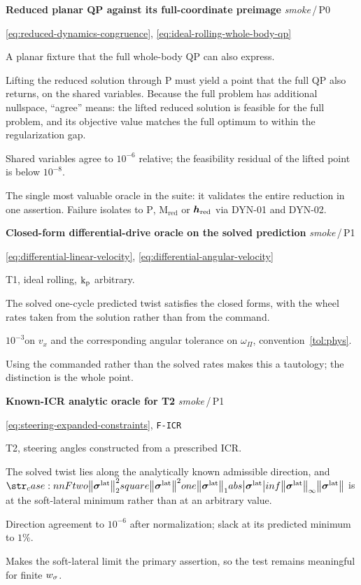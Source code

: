 \documentclass[10pt]{article}
\newcommand{\slackVariable}{\bs{\sigma}}
\newenvironment{testcard}[4]{%
  \par\medskip\noindent
  \tBlock{#1}\quad\textbf{#2}%
  \hfill{\small\textit{#3}\,/\,#4}\par\nopagebreak\vspace{2pt}
  \begin{description}[leftmargin=7.5em,style=sameline,itemsep=1pt,topsep=1pt]
}{%
  \end{description}\par\medskip
}
\begin{document}
\begin{testcard}{ORC-02}{Reduced planar QP against its full-coordinate preimage}{smoke}{P0}
  \item[Targets] \eqref{eq:reduced-dynamics-congruence},
    \eqref{eq:ideal-rolling-whole-body-qp}
  \item[Regime] A planar fixture that the full whole-body QP can also express.
  \item[Invariant] Lifting the reduced solution through $\text{P}$ must yield a
    point that the full QP also returns, on the shared variables. Because the
    full problem has additional nullspace, ``agree'' means: the lifted reduced
    solution is feasible for the full problem, and its objective value matches
    the full optimum to within the regularization gap.
  \item[Pass] Shared variables agree to $10^{-6}$ relative; the feasibility
    residual of the lifted point is below $10^{-8}$.
  \item[Diagnosis] The single most valuable oracle in the suite: it validates
    the entire reduction in one assertion. Failure isolates to $\text{P}$,
    $\text{M}_{\text{red}}$ or $\boldsymbol{h}_{\text{red}}$ via DYN-01 and DYN-02.
\end{testcard}

\begin{testcard}{ORC-03}{Closed-form differential-drive oracle on the solved prediction}{smoke}{P1}
  \item[Targets] \eqref{eq:differential-linear-velocity},
    \eqref{eq:differential-angular-velocity}
  \item[Regime] T1, ideal rolling, $\text{k}_{\text{p}}$ arbitrary.
  \item[Invariant] The solved one-cycle predicted twist satisfies the closed
    forms, with the wheel rates taken from the solution rather than from the
    command.
  \item[Pass] $10^{-3}$\unitVelTS on $v_x$ and the corresponding angular
    tolerance on $\omega_{\Pi}$, convention~\ref{tol:phys}.
  \item[Diagnosis] Using the commanded rather than the solved rates makes this
    a tautology; the distinction is the whole point.
\end{testcard}

\begin{testcard}{ORC-04}{Known-ICR analytic oracle for T2}{smoke}{P1}
  \item[Targets] \eqref{eq:steering-expanded-constraints}, \texttt{F-ICR}
  \item[Regime] T2, steering angles constructed from a prescribed ICR.
  \item[Invariant] The solved twist lies along the analytically known
    admissible direction, and $\norm{\slackVariable^{\text{lat}}}$ is at the
    soft-lateral minimum rather than at an arbitrary value.
  \item[Pass] Direction agreement to $10^{-6}$ after normalization; slack at
    its predicted minimum to $1\%$.
  \item[Diagnosis] Makes the soft-lateral limit the primary assertion, so the
    test remains meaningful for finite $w_{\sigma}$.
\end{testcard}
\end{document}
